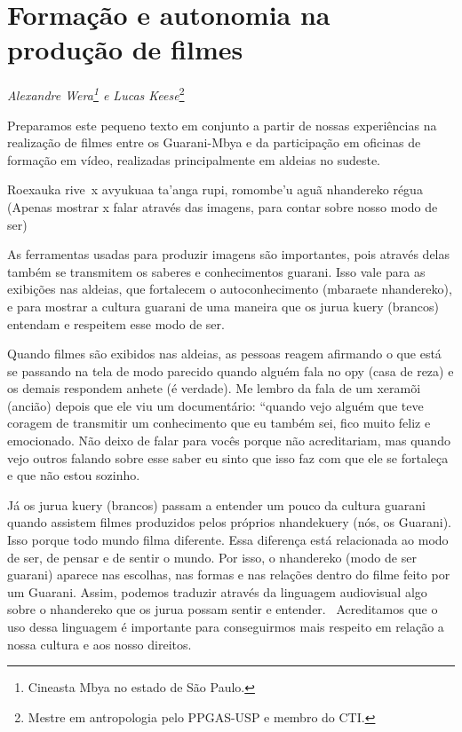 \chapter{Formação e autonomia na produção de filmes}
\begin{flushright}
\emph{Alexandre Wera\footnote{Cineasta Mbya no estado de São Paulo.} e Lucas
Keese}\footnote{Mestre em antropologia pelo PPGAS-USP e membro do
CTI.}
\end{flushright}
\medskip

Preparamos este pequeno texto em conjunto a partir de nossas
experiências na realização de filmes entre os Guarani-Mbya e da
participação em oficinas de formação em vídeo, realizadas
principalmente em aldeias no sudeste.

Roexauka rive~x avyukuaa ta’anga rupi, romombe’u aguã nhandereko régua
(Apenas mostrar x falar através das imagens, para contar sobre nosso
modo de ser)%


As ferramentas usadas para produzir imagens são importantes, pois
através delas também se transmitem os saberes e conhecimentos guarani.
Isso vale para as exibições nas aldeias, que fortalecem o
autoconhecimento (mbaraete nhandereko), e para mostrar a cultura
guarani de uma maneira que os jurua kuery (brancos) entendam e
respeitem esse modo de ser.

Quando filmes são exibidos nas aldeias, as pessoas reagem afirmando o
que está se passando na tela de modo parecido quando alguém fala no opy
(casa de reza) e os demais respondem anhete (é verdade). Me lembro da
fala de um xeramõi (ancião) depois que ele viu um documentário: ``quando
vejo alguém que teve coragem de transmitir um conhecimento que eu
também sei, fico muito feliz e emocionado. Não deixo de falar para
vocês porque não acreditariam, mas quando vejo outros falando sobre
esse saber eu sinto que isso faz com que ele se fortaleça e que não
estou sozinho.

Já os jurua kuery (brancos) passam a entender um pouco da cultura
guarani quando assistem filmes produzidos pelos próprios nhandekuery
(nós, os Guarani). Isso porque todo mundo filma diferente. Essa
diferença está relacionada ao modo de ser, de pensar e de sentir o
mundo. Por isso, o nhandereko (modo de ser guarani) aparece nas
escolhas, nas formas e nas relações dentro do filme feito por um
Guarani. Assim, podemos traduzir através da linguagem audiovisual algo
sobre o nhandereko que os jurua possam sentir e entender.~ Acreditamos
que o uso dessa linguagem é importante para conseguirmos mais respeito
em relação a nossa cultura e aos nosso direitos.

